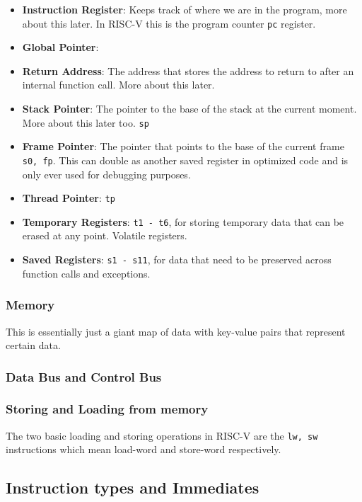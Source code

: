 \documentclass{article}
\begin{document}
\begin{itemize}
	\item \textbf{Instruction Register}: Keeps track of where we are in the program, more about this later. In RISC-V this is the program counter \verb|pc| register. %
	\item \textbf{Global Pointer}: %
	\item \textbf{Return Address}: The address that stores the address to return to after an internal function call. More about this later. %
	\item \textbf{Stack Pointer}: The pointer to the base of the stack at the current moment. More about this later too. \verb|sp| %
	\item \textbf{Frame Pointer}: The pointer that points to the base of the current frame \verb|s0, fp|. This can double as another saved register in optimized code and is only ever used for debugging purposes.
	\item \textbf{Thread Pointer}: \verb|tp|%
	\item \textbf{Temporary Registers}: \verb|t1 - t6|, for storing temporary data that can be erased at any point. Volatile registers.
	\item \textbf{Saved Registers}: \verb|s1 - s11|, for data that need to be preserved across function calls and exceptions.
\end{itemize}
\subsubsection{Memory}
This is essentially just a giant map of data with key-value pairs that represent certain data.

\subsubsection{Data Bus and Control Bus}

\subsubsection{Storing and Loading from memory}
The two basic loading and storing operations in RISC-V are the \verb*|lw, sw| instructions which mean load-word and store-word respectively.%

\subsection{Instruction types and Immediates}
\end{document}
